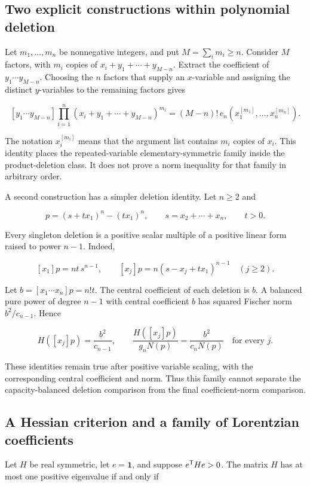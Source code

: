 \subsection{Two explicit constructions within polynomial deletion}\label{app:additional-25}

Let \(m_1,\ldots,m_n\) be nonnegative integers, and put \(M=\sum_i m_i\ge n\). Consider \(M\) factors, with \(m_i\) copies of \(x_i+y_1+\cdots+y_{M-n}\). Extract the coefficient of \(y_1\cdots y_{M-n}\). Choosing the \(n\) factors that supply an \(x\)-variable and assigning the distinct \(y\)-variables to the remaining factors gives

\[
[y_1\cdots y_{M-n}]
\prod_{i=1}^n(x_i+y_1+\cdots+y_{M-n})^{m_i}
=(M-n)!\,e_n(x_1^{[m_1]},\ldots,x_n^{[m_n]}).
\]

The notation \(x_i^{[m_i]}\) means that the argument list contains \(m_i\) copies of \(x_i\). This identity places the repeated-variable elementary-symmetric family inside the product-deletion class. It does not prove a norm inequality for that family in arbitrary order.

A second construction has a simpler deletion identity. Let \(n\ge2\) and

\[
p=(s+tx_1)^n-(tx_1)^n,\qquad
s=x_2+\cdots+x_n,\qquad t>0.
\]

Every singleton deletion is a positive scalar multiple of a positive linear form raised to power \(n-1\). Indeed,

\[
[x_1]p=nt\,s^{n-1},\qquad
[x_j]p=n(s-x_j+tx_1)^{n-1}\quad(j\ge2).
\]

Let \(b=[x_1\cdots x_n]p=n!t\). The central coefficient of each deletion is \(b\). A balanced pure power of degree \(n-1\) with central coefficient \(b\) has squared Fischer norm \(b^2/c_{n-1}\). Hence

\[
H([x_j]p)=\frac{b^2}{c_{n-1}},\qquad
\frac{H([x_j]p)}{g_nN(p)}=\frac{b^2}{c_nN(p)}
\quad\text{for every }j.
\]

These identities remain true after positive variable scaling, with the corresponding central coefficient and norm. Thus this family cannot separate the capacity-balanced deletion comparison from the final coefficient-norm comparison.

\subsection{A Hessian criterion and a family of Lorentzian coefficients}\label{app:additional-26}

Let \(H\) be real symmetric, let \(e=\mathbf1\), and suppose \(e^{\mathsf{T}}He>0\). The matrix \(H\) has at most one positive eigenvalue if and only if

